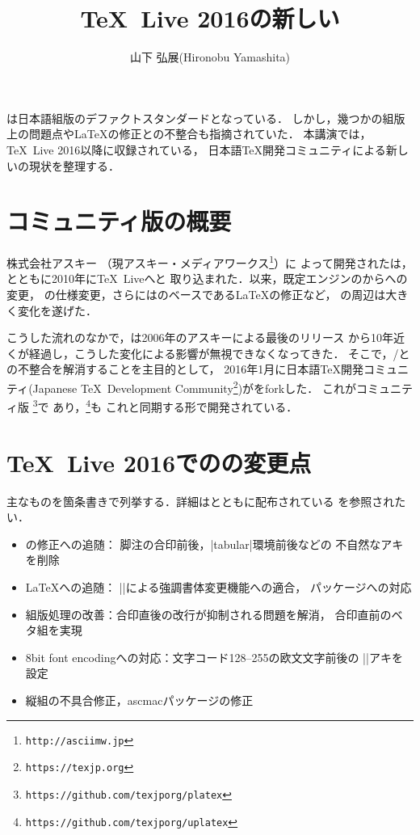 \documentclass[a4paper,twocolumn]{jsarticle}
\title{\TeX\ Live 2016の新しい\pLaTeX}
\author{山下 弘展(Hironobu Yamashita)}
\date{}
\begin{document}
\maketitle

\pLaTeX は日本語組版のデファクトスタンダードとなっている．
しかし，幾つかの組版上の問題点や\LaTeX の修正との不整合も指摘されていた．
本講演では，\TeX\ Live 2016以降に収録されている，
日本語\TeX 開発コミュニティによる新しい\pLaTeX の現状を整理する．

\section{コミュニティ版\pLaTeX の概要}
株式会社アスキー
（現アスキー・メディアワークス\footnote{\texttt{http://asciimw.jp}}）に
よって開発された\pLaTeX は，\pTeX とともに2010年に\TeX\ Liveへと
取り込まれた．以来，既定エンジンの\pTeX から\epTeX への変更，
\epTeX の仕様変更，さらには\pLaTeX のベースである\LaTeX の修正など，
\pLaTeX の周辺は大きく変化を遂げた．

こうした流れのなかで，\pLaTeX は2006年のアスキーによる最後のリリース
から10年近くが経過し，こうした変化による影響が無視できなくなってきた．
そこで，\pTeX/\epTeX との不整合を解消することを主目的として，
2016年1月に日本語\TeX 開発コミュニティ(Japanese \TeX\ Development
Community\footnote{\texttt{https://texjp.org}})が\pLaTeX をforkした．
これがコミュニティ版
\pLaTeX\footnote{\texttt{https://github.com/texjporg/platex}}で
あり，\upLaTeX\footnote{\texttt{https://github.com/texjporg/uplatex}}も
これと同期する形で開発されている．

\section{\TeX\ Live 2016での\pLaTeX の変更点}
主なものを箇条書きで列挙する．詳細は\pLaTeX とともに配布されている
を参照されたい．
\begin{itemize}
  \item \pTeX の修正への追随：
        脚注の合印前後，|tabular|環境前後などの
        不自然なアキを削除
  \item \LaTeX への追随：
        |\eminnershape|による強調書体変更機能への適合，
        パッケージへの対応
  \item 組版処理の改善：合印直後の改行が抑制される問題を解消，
        合印直前のベタ組を実現
  \item 8bit font encodingへの対応：文字コード128--255の欧文文字前後の
        |\xkanjiskip|アキを設定
  \item 縦組の不具合修正，ascmacパッケージの修正
\end{itemize}
\end{document}
